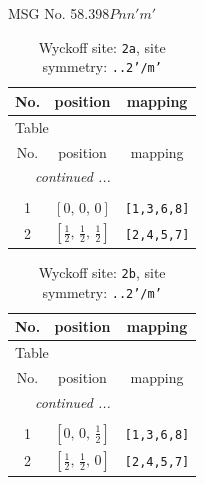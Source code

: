 \documentclass[fleqn,8pt]{jsarticle}
\begin{document}
\setcounter{MaxMatrixCols}{32}

\renewcommand{\tablename}{Table~}
\renewcommand{\figurename}{Figure~}
\begin{center}
\LARGE
MSG No. 58.398\quad$Pnn'm'$
\end{center}
\renewcommand{\arraystretch}{1.2}
\begin{longtable}{ccc}
\caption{Wyckoff site: {\tt 2a}, site symmetry: {\tt ..2'/m'}}
 \\
 \hline \hline
No. & position & mapping \\ \hline \endfirsthead

\multicolumn{2}{l}{\tablename\ \thetable{}} \\
 \hline \hline
No. & position & mapping \\ \hline \endhead

 \hline \hline
\multicolumn{2}{r}{\footnotesize\it continued ...} \\ \endfoot

 \hline \hline
\multicolumn{2}{r}{} \\ \endlastfoot

1 & $\left[ 0,\, 0,\, 0 \right]$ & {\tt [1,3,6,8]} \\ \hline
2 & $\left[ \frac{1}{2},\, \frac{1}{2},\, \frac{1}{2} \right]$ & {\tt [2,4,5,7]} \\
\end{longtable}
\renewcommand{\arraystretch}{1.2}
\begin{longtable}{ccc}
\caption{Wyckoff site: {\tt 2b}, site symmetry: {\tt ..2'/m'}}
 \\
 \hline \hline
No. & position & mapping \\ \hline \endfirsthead

\multicolumn{2}{l}{\tablename\ \thetable{}} \\
 \hline \hline
No. & position & mapping \\ \hline \endhead

 \hline \hline
\multicolumn{2}{r}{\footnotesize\it continued ...} \\ \endfoot

 \hline \hline
\multicolumn{2}{r}{} \\ \endlastfoot

1 & $\left[ 0,\, 0,\, \frac{1}{2} \right]$ & {\tt [1,3,6,8]} \\ \hline
2 & $\left[ \frac{1}{2},\, \frac{1}{2},\, 0 \right]$ & {\tt [2,4,5,7]} \\
\end{longtable}
\end{document}
